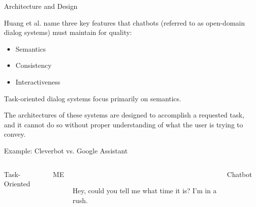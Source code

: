 \documentclass[10pt]{beamer}
\begin{document}
 

\begin{frame}{Architecture and Design}

Huang et al. name three key features that chatbots (referred to as open-domain dialog systems) must maintain for quality:

    \begin{itemize}

        \item Semantics

        \item Consistency

        \item Interactiveness

    \end{itemize}

Task-oriented dialog systems focus primarily on semantics.

 

The architectures of these systems are designed to accomplish a requested task, and it cannot do so without proper understanding of what the user is trying to convey.

\end{frame}

 

\begin{frame}{Example: Cleverbot vs. Google Assistant}

    \begin{columns}[T,onlytextwidth]


      Task-Oriented

      \begin{description}

        \item[ME] Hey, could you tell me what time it is? I'm in a rush.

      \end{description}

 


      Chatbot

  \end{columns}

\end{frame}

 
\end{document}
